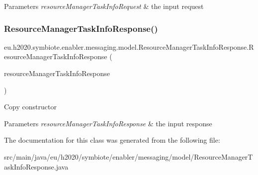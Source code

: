\begin{DoxyParams}{Parameters}
{\em resource\+Manager\+Task\+Info\+Request} & the input request \\
\hline
\end{DoxyParams}
\mbox{\label{classeu_1_1h2020_1_1symbiote_1_1enabler_1_1messaging_1_1model_1_1ResourceManagerTaskInfoResponse_a6311ebbea2b86467556024a001f35244}} 
\subsubsection{\texorpdfstring{Resource\+Manager\+Task\+Info\+Response()}{ResourceManagerTaskInfoResponse()}\hspace{0.1cm}{\footnotesize\ttfamily [4/4]}}
{\footnotesize\ttfamily eu.\+h2020.\+symbiote.\+enabler.\+messaging.\+model.\+Resource\+Manager\+Task\+Info\+Response.\+Resource\+Manager\+Task\+Info\+Response (\begin{DoxyParamCaption}\item[{\hyperlink{classeu_1_1h2020_1_1symbiote_1_1enabler_1_1messaging_1_1model_1_1ResourceManagerTaskInfoResponse}{Resource\+Manager\+Task\+Info\+Response}}]{resource\+Manager\+Task\+Info\+Response }\end{DoxyParamCaption})}

Copy constructor


\begin{DoxyParams}{Parameters}
{\em resource\+Manager\+Task\+Info\+Response} & the input response \\
\hline
\end{DoxyParams}


The documentation for this class was generated from the following file\+:\begin{DoxyCompactItemize}
\item 
src/main/java/eu/h2020/symbiote/enabler/messaging/model/Resource\+Manager\+Task\+Info\+Response.\+java\end{DoxyCompactItemize}
